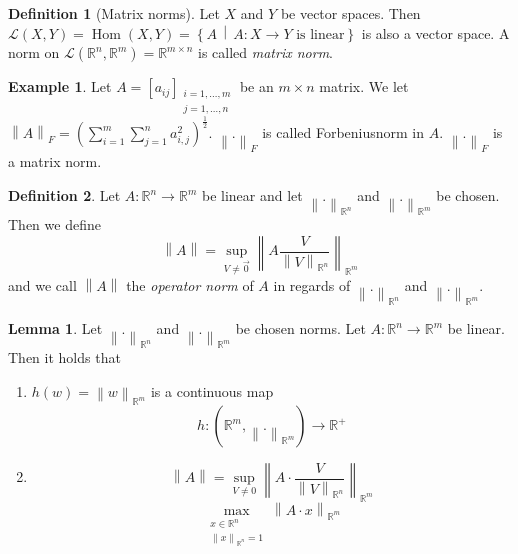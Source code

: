 \documentclass[a4paper,landscape,twocolumn]{article}
\theoremstyle{definition}
\newtheorem{defi}{Definition}
\newtheorem{ex}{Example}
\newtheorem{lemma}{Lemma}
\newcommand\setdef[2]{\left\{#1\,\middle|\,#2\right\}}
\newcommand\norm[1]{\left\|#1\right\|}
\begin{document}
\begin{defi}[Matrix norms]
  Let $X$ and $Y$ be vector spaces. Then $\mathcal{L}(X, Y) = \operatorname{Hom}(X, Y) = \setdef{A}{A: X \to Y \text{ is linear}}$
  is also a vector space.
  A norm on $\mathcal{L}(\mathbb R^n, \mathbb R^m) = \mathbb R^{m\times n}$ is called \emph{matrix norm}.
\end{defi}

\begin{ex}
  Let $A = [a_{ij}]_{\substack{i = 1, \ldots, m \\ j = 1, \ldots, n}}$ be an $m \times n$ matrix.
  We let $\norm{A}_{F} = \left(\sum_{i=1}^m \sum_{j=1}^n a_{i,j}^2\right)^{\frac 12}$.
  $\norm{.}_F$ is called Forbeniusnorm in $A$. $\norm{.}_F$ is a matrix norm.
\end{ex}

\begin{defi}
  Let $A: \mathbb R^n \to \mathbb R^m$ be linear and let $\norm{.}_{\mathbb R^n}$ and $\norm{.}_{\mathbb R^m}$ be chosen.
  Then we define
  \[ \norm{A} = \sup_{V \neq \vec{0}}{\norm{A \frac{V}{{\norm{V}}_{\mathbb R^n}}}_{\mathbb R^m}} \]
  and we call $\norm{A}$ the \emph{operator norm} of $A$ in regards of $\norm{.}_{\mathbb R^n}$ and $\norm{.}_{\mathbb R^m}$.
\end{defi}

\begin{lemma}
  Let $\norm{.}_{\mathbb R^n}$ and $\norm{.}_{\mathbb R^m}$ be chosen norms.
  Let $A: \mathbb R^n \to \mathbb R^m$ be linear. Then it holds that
  \begin{enumerate}
  \item $h(w) = \norm{w}_{\mathbb R^m}$ is a continuous map
    \[ h: (\mathbb R^m, \norm{.}_{\mathbb R^m}) \to \mathbb R^+ \]
  \item
    \[ \norm{A} = \sup_{V \neq 0} \norm{A \cdot \frac{V}{\norm{V}_{\mathbb R^n}}}_{\mathbb R^m} \]
    \[ \max_{\substack{x \in \mathbb R^n \\ \norm{x}_{\mathbb R^n} = 1}} \norm{A \cdot x}_{\mathbb R^m} \]
  \end{enumerate}
\end{lemma}
\end{document}
